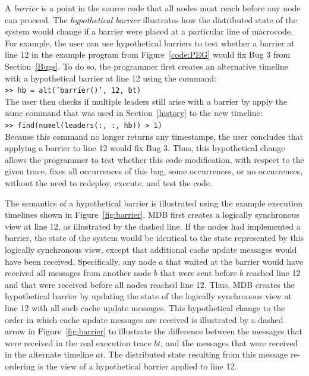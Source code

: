 A \emph{barrier} is a point in the source code that all nodes must reach before
any node can proceed.  The \emph{hypothetical barrier} illustrates how the
distributed state of the system would change if a barrier were placed at a
particular line of macrocode.  For example, the user can use hypothetical
barriers to test whether a barrier at line 12 in the example program
from Figure~\ref{code:PEG} would fix Bug 3 from Section~\ref{Bugs}.  To do so, the
programmer first creates an alternative timeline with a hypothetical barrier at
line 12 using the command:\\ {\small\indent\tt >> hb = alt('barrier()', 12,
  bt)}\\ The user then checks if multiple leaders still arise with a
barrier by apply the same command that was used in Section~\ref{history} to the
new timeline:\\ {\tt\small\indent >> find(numel(leaders(:, :, hb)) >
  1)}\\ Because this command no longer returns any timestamps, the user
concludes that applying a barrier to line 12 would fix Bug 3.  Thus, this
hypothetical change allows the programmer to test whether this code
modification, with respect to the given trace, fixes all occurrences of this
bug, some occurrences, or no occurrences, without the need to redeploy, execute,
and test the code.

The semantics of a hypothetical barrier is illustrated using the example
execution timelines shown in Figure~\ref{fig:barrier}.  MDB first creates a
logically synchronous view at line 12, as illustrated by the dashed line.  If
the nodes had implemented a barrier, the state of the system would be identical
to the state represented by this logically synchronous view, except that
additional cache update messages would have been received.  Specifically, any
node $a$ that waited at the barrier would have received all messages from
another node $b$ that were sent before $b$ reached line 12 and that were
received before all nodes reached line 12. Thus, MDB creates the hypothetical
barrier by updating the state of the logically synchronous view at line 12 with
all such cache update messages.  This hypothetical change to the order in which
cache update messages are received is illustrated by a dashed arrow in
Figure~\ref{fig:barrier} to illustrate the difference between the messages that
were received in the real execution trace $bt$, and the messages that were
received in the alternate timeline $at$. The distributed state resulting from
this message re-ordering is the view of a hypothetical barrier applied to line
12.

